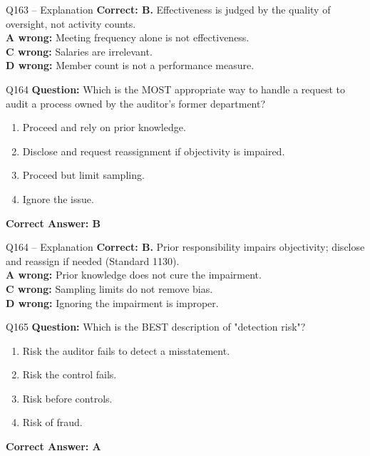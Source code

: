 \documentclass[aspectratio=169,10pt]{beamer}
\begin{document}
	\begin{frame}[t]{Q163 -- Explanation}
		\small
		\textbf{Correct: B.} Effectiveness is judged by the quality of oversight, not activity counts. \\[4pt]
		\textbf{A wrong:} Meeting frequency alone is not effectiveness. \\[2pt]
		\textbf{C wrong:} Salaries are irrelevant. \\[2pt]
		\textbf{D wrong:} Member count is not a performance measure.
	\end{frame}
	
	\begin{frame}[t]{Q164}
		\small
		\textbf{Question:} Which is the MOST appropriate way to handle a request to audit a process owned by the auditor's former department?
		\begin{enumerate}[label=\Alph*.,itemsep=1pt,topsep=2pt]
			\item Proceed and rely on prior knowledge.
			\item Disclose and request reassignment if objectivity is impaired.
			\item Proceed but limit sampling.
			\item Ignore the issue.
		\end{enumerate}
		\vspace{4pt}
		\textbf{Correct Answer: B}
	\end{frame}
	
	\begin{frame}[t]{Q164 -- Explanation}
		\small
		\textbf{Correct: B.} Prior responsibility impairs objectivity; disclose and reassign if needed (Standard 1130). \\[4pt]
		\textbf{A wrong:} Prior knowledge does not cure the impairment. \\[2pt]
		\textbf{C wrong:} Sampling limits do not remove bias. \\[2pt]
		\textbf{D wrong:} Ignoring the impairment is improper.
	\end{frame}
	
	\begin{frame}[t]{Q165}
		\small
		\textbf{Question:} Which is the BEST description of "detection risk"?
		\begin{enumerate}[label=\Alph*.,itemsep=1pt,topsep=2pt]
			\item Risk the auditor fails to detect a misstatement.
			\item Risk the control fails.
			\item Risk before controls.
			\item Risk of fraud.
		\end{enumerate}
		\vspace{4pt}
		\textbf{Correct Answer: A}
	\end{frame}
	
\end{document}
